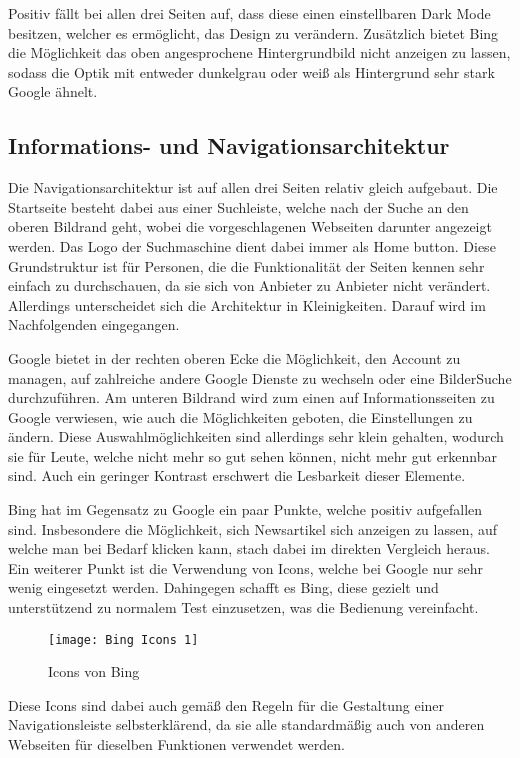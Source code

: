 Positiv fällt bei allen drei Seiten auf, dass diese einen einstellbaren Dark Mode besitzen, welcher es ermöglicht, das Design zu verändern.
Zusätzlich bietet Bing die Möglichkeit das oben angesprochene Hintergrundbild nicht anzeigen zu lassen,
sodass die Optik mit entweder dunkelgrau oder weiß als Hintergrund sehr stark Google ähnelt.

\subsection{Informations- und Navigationsarchitektur}\label{subsec:informations--und-navigationsarchitektur}
Die Navigationsarchitektur ist auf allen drei Seiten relativ gleich aufgebaut.
Die Startseite besteht dabei aus einer Suchleiste,
welche nach der Suche an den oberen Bildrand geht, wobei die vorgeschlagenen Webseiten darunter angezeigt werden.
Das Logo der Suchmaschine dient dabei immer als Home button.
Diese Grundstruktur ist für Personen, die die Funktionalität der
Seiten kennen sehr einfach zu durchschauen, da sie sich von Anbieter zu Anbieter nicht verändert.
Allerdings unterscheidet sich die Architektur in Kleinigkeiten.
Darauf wird im Nachfolgenden eingegangen.

Google bietet in der rechten oberen Ecke die Möglichkeit, den Account zu managen, auf zahlreiche andere Google Dienste zu
wechseln oder eine Bilder\-Suche durchzuführen.
Am unteren Bildrand wird zum einen auf Informationsseiten zu Google verwiesen,
wie auch die Möglichkeiten geboten, die Einstellungen zu ändern.
Diese Auswahlmöglichkeiten sind allerdings sehr klein gehalten,
wodurch sie für Leute, welche nicht mehr so gut sehen können, nicht mehr gut erkennbar sind.
Auch ein geringer Kontrast erschwert die Lesbarkeit dieser Elemente.

Bing hat im Gegensatz zu Google ein paar Punkte, welche positiv aufgefallen sind.
Insbesondere die Möglichkeit, sich Newsartikel sich anzeigen zu lassen,
auf welche man bei Bedarf klicken kann, stach dabei im direkten Vergleich heraus.
Ein weiterer Punkt ist die Verwendung von Icons, welche bei Google nur sehr wenig eingesetzt werden.
Dahingegen schafft es Bing, diese gezielt und unterstützend zu normalem Test einzusetzen, was die Bedienung vereinfacht.
\begin{figure}[ht]
    \centering
    \texttt{[image: Bing Icons 1]}
    \caption{Icons von Bing}\label{fig:figure8}
\end{figure}
Diese Icons sind dabei auch gemäß den Regeln
für die Gestaltung einer Navigationsleiste\autocite[Seite 17]{Maulhardt.20220621b} selbsterklärend, da sie alle standardmäßig auch von
anderen Webseiten für dieselben Funktionen verwendet werden.


